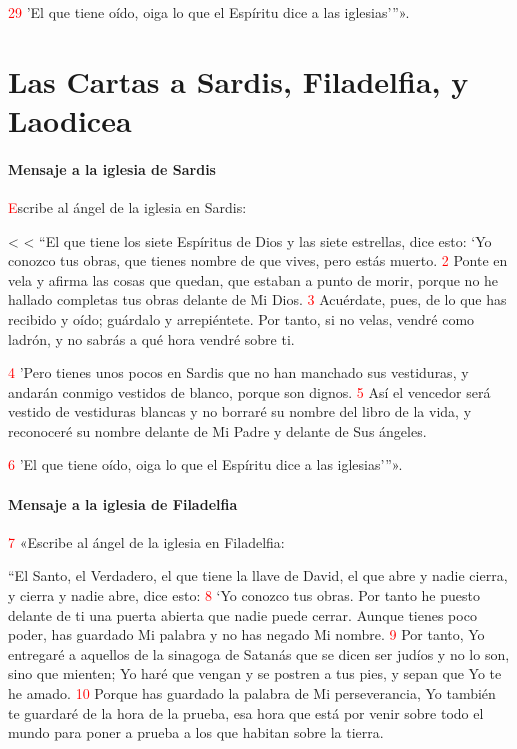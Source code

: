 \documentclass[12pt,twocolumn,twoside]{book}
\makeatletter
\newcommand{\vnum}[1]{\textcolor{red}{\normalsize{#1}}}
\def\zz{%
\ifnum\prevgraf<\c@L@lines
\zzc\z@
\loop
\ifnum\zzc<\prevgraf
\advance\zzc\@ne
\afterassignment\zzda\count@\L@parshape\relax
\repeat
\parshape\L@parshape
\fi}
\def\zzda{\afterassignment\zzdb\dimen@}
\def\zzdb{\afterassignment\zzdef\dimen@}
\def\zzdef#1\relax{\edef\L@parshape{\the\numexpr\count@-1\relax\space #1}}
\makeatother
\begin{document}
\vnum{29} ’El que tiene oído, oiga lo que el Espíritu dice a las iglesias’”».

\chapter{Las Cartas a Sardis, Filadelfia, y Laodicea}
\subsubsection*{Mensaje a la iglesia de Sardis}
\lettrine[lines=4,lhang=0.1,ante=«]{\textcolor{red}{E}}{}scribe al ángel de la iglesia en Sardis:

\zz“El que tiene los siete Espíritus de Dios y las siete estrellas, dice esto: ‘Yo conozco tus obras, que tienes nombre de que vives, pero estás muerto. %
\vnum{2} Ponte en vela y afirma las cosas que quedan, que estaban a punto de morir, porque no he hallado completas tus obras delante de Mi Dios. 
\vnum{3} Acuérdate, pues, de lo que has recibido y oído; guárdalo y arrepiéntete. Por tanto, si no velas, vendré como ladrón, y no sabrás a qué hora vendré sobre ti.

\vnum{4} ’Pero tienes unos pocos en Sardis que no han manchado sus vestiduras, y andarán conmigo vestidos de blanco, porque son dignos. 
\vnum{5} Así el vencedor será vestido de vestiduras blancas y no borraré su nombre del libro de la vida, y reconoceré su nombre delante de Mi Padre y delante de Sus ángeles.

\vnum{6} ’El que tiene oído, oiga lo que el Espíritu dice a las iglesias’”».
\subsubsection*{Mensaje a la iglesia de Filadelfia}
\vnum{7} «Escribe al ángel de la iglesia en Filadelfia:

“El Santo, el Verdadero, el que tiene la llave de David, el que abre y nadie cierra, y cierra y nadie abre, dice esto: %
\vnum{8} ‘Yo conozco tus obras. Por tanto he puesto delante de ti una puerta abierta que nadie puede cerrar. Aunque tienes poco poder, has guardado Mi palabra y no has negado Mi nombre. %
\vnum{9} Por tanto, Yo entregaré a aquellos de la sinagoga de Satanás que se dicen ser judíos y no lo son, sino que mienten; Yo haré que vengan y se postren a tus pies, y sepan que Yo te he amado. %
\vnum{10} Porque has guardado la palabra de Mi perseverancia, Yo también te guardaré de la hora de la prueba, esa hora que está por venir sobre todo el mundo para poner a prueba a los que habitan sobre la tierra.
\end{document}
